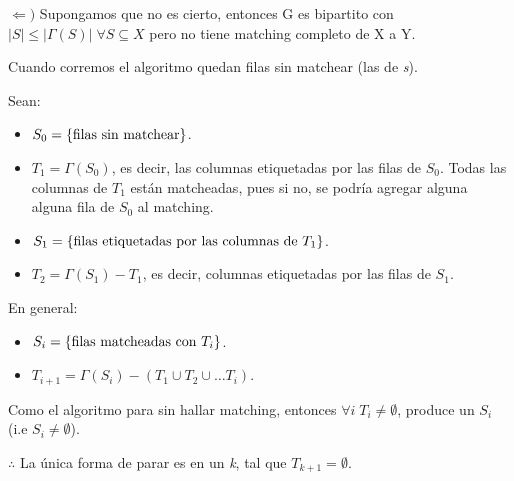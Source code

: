 \documentclass[12pt,a4paper]{report}
\newcounter{neq}
\begin{document}
			\vspace{5mm}
			\par $\Leftarrow)$ Supongamos que no es cierto, entonces G es bipartito con $\lvert S \rvert \leq \lvert \Gamma(S) \rvert \; \forall S \subseteq X$ pero no tiene matching completo de X a Y. 
			
			\vspace{5 mm}
			\par Cuando corremos el algoritmo quedan filas sin matchear (las de \textit{s}).
			
			\pagebreak
			\par Sean:
			\begin{itemize}
				\item $S_{0} = \lbrace \textup{filas sin matchear} \rbrace$.
				\item $T_{1} = \Gamma(S_{0})$, es decir, las columnas etiquetadas por las filas de $S_{0}$. Todas las columnas de $T_{1}$ están matcheadas, pues si no, se podría agregar alguna alguna fila de $S_{0}$ al matching.
				\item $S_{1} = \lbrace \textup{filas etiquetadas por las columnas de } T_{1}\rbrace$.
				\item $T_{2} = \Gamma(S_{1}) - T_{1}$, es decir, columnas etiquetadas por las filas de $S_{1}$.
			\end{itemize}

			\par En general:
			\begin{center}
				\begin{itemize}
					\item $S_{i} = \lbrace \textup{filas matcheadas con } T_{i}\rbrace$.
					\item $T_{i+1} = \Gamma(S_{i}) - (T_{1} \cup T_{2} \cup \dotsc T_{i})$.
				\end{itemize}
			\end{center}

			\par Como el algoritmo para sin hallar matching, entonces $\forall i \; T_{i} \neq \emptyset $, produce un $S_{i}$  (i.e $S_{i} \neq \emptyset$).
			\par $\therefore$ La única forma de parar es en un \textit{k}, tal que $T_{k+1} = \emptyset$.
\end{document}

